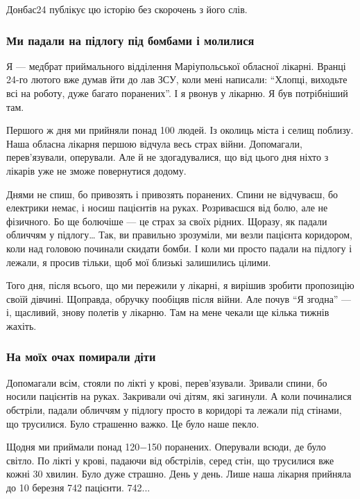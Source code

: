 Донбас24 публікує цю історію без скорочень з його слів.


\subsubsection{Ми падали на підлогу під бомбами і молилися}

Я — медбрат приймального відділення Маріупольської обласної лікарні. Вранці
24-го лютого вже думав йти до лав ЗСУ, коли мені написали: \enquote{Хлопці, виходьте
всі на роботу, дуже багато поранених}. І я рвонув у лікарню. Я був потрібніший
там.

Першого ж дня ми прийняли понад 100 людей. Із околиць міста і селищ поблизу.
Наша обласна лікарня першою відчула весь страх війни. Допомагали,
перев’язували, оперували. Але й не здогадувалися, що від цього дня ніхто з
лікарів уже не зможе повернутися додому.

Днями не спиш, бо привозять і привозять поранених. Спини не відчуваєш, бо
електрики немає, і носиш пацієнтів на руках. Розриваєшся від болю, але не
фізичного. Бо ще болючіше — це страх за своїх рідних. Щоразу, як падали
обличчям у підлогу… Так, ви правильно зрозуміли, ми везли пацієнта коридором,
коли над головою починали скидати бомби. І коли ми просто падали на підлогу і
лежали, я просив тільки, щоб мої близькі залишились цілими.

Того дня, після всього, що ми пережили у лікарні, я вирішив зробити пропозицію
своїй дівчині. Щоправда, обручку пообіцяв після війни. Але почув \enquote{Я згодна} —
і, щасливий, знову полетів у лікарню. Там на мене чекали ще кілька тижнів
жахіть.

\subsubsection{На моїх очах помирали діти}

Допомагали всім, стояли по лікті у крові, перев'язували. Зривали спини, бо
носили пацієнтів на руках. Закривали очі дітям, які загинули. А коли починалися
обстріли, падали обличчям у підлогу просто в коридорі та лежали під стінами, що
трусилися. Було страшенно важко. Це було наше пекло.

Щодня ми приймали понад 120−150 поранених. Оперували всюди, де було світло. По
лікті у крові, падаючи від обстрілів, серед стін, що трусилися вже кожні 30
хвилин. Було дуже страшно. День у день. Лише наша лікарня прийняла до 10
березня 742 пацієнти. 742...

